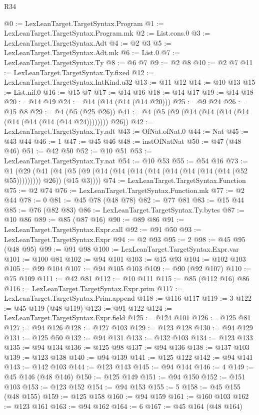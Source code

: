 \begin{lexlean}{R34}
\begin{coremodule}
@0 := LexLeanTarget.TargetSyntax.Program
@1 := LexLeanTarget.TargetSyntax.Program.mk
@2 := List.cons.{0}
@3 := LexLeanTarget.TargetSyntax.Adt
@4 := @2 @3
@5 := LexLeanTarget.TargetSyntax.Adt.mk
@6 := List.{0}
@7 := LexLeanTarget.TargetSyntax.Ty
@8 := @6 @7
@9 := @2 @8
@10 := @2 @7
@11 := LexLeanTarget.TargetSyntax.Ty.fixed
@12 := LexLeanTarget.TargetSyntax.IntKind.u32
@13 := @11 @12
@14 := @10 @13
@15 := List.nil.{0}
@16 := @15 @7
@17 := @14 @16
@18 := @14 @17
@19 := @14 @18
@20 := @14 @19
@24 := @14 (@14 (@14 (@14 @20)))
@25 := @9 @24
@26 := @15 @8
@29 := @4 (@5 (@25 @26))
@41 := @4 (@5 (@9 (@14 (@14 (@14 (@14 (@14 (@14 (@14 (@14 @24)))))))) @26))
@42 := LexLeanTarget.TargetSyntax.Ty.adt
@43 := OfNat.ofNat.{0}
@44 := Nat
@45 := @43 @44
@46 := 1
@47 := @45 @46
@48 := instOfNatNat
@50 := @47 (@48 @46)
@51 := @42 @50
@52 := @10 @51
@53 := LexLeanTarget.TargetSyntax.Ty.nat
@54 := @10 @53
@55 := @54 @16
@73 := @1
    (@29
      (@41 (@4 (@5 (@9 (@14 (@14 (@14 (@14 (@14 (@14 (@14 (@14 (@52 @55))))))))) @26)) (@15 @3))))
@74 := LexLeanTarget.TargetSyntax.Function
@75 := @2 @74
@76 := LexLeanTarget.TargetSyntax.Function.mk
@77 := @2 @44
@78 := 0
@81 := @45 @78 (@48 @78)
@82 := @77 @81
@83 := @15 @44
@85 := @76 (@82 @83)
@86 := LexLeanTarget.TargetSyntax.Ty.bytes
@87 := @10 @86
@89 := @85 (@87 @16)
@90 := @89 @86
@91 := LexLeanTarget.TargetSyntax.Expr.call
@92 := @91 @50
@93 := LexLeanTarget.TargetSyntax.Expr
@94 := @2 @93
@95 := 2
@98 := @45 @95 (@48 @95)
@99 := @91 @98
@100 := LexLeanTarget.TargetSyntax.Expr.var
@101 := @100 @81
@102 := @94 @101
@103 := @15 @93
@104 := @102 @103
@105 := @99 @104
@107 := @94 @105 @103
@109 := @90 (@92 @107)
@110 := @75 @109
@111 := @42 @81
@112 := @10 @111
@115 := @85 (@112 @16) @86
@116 := LexLeanTarget.TargetSyntax.Expr.prim
@117 := LexLeanTarget.TargetSyntax.Prim.append
@118 := @116 @117
@119 := 3
@122 := @45 @119 (@48 @119)
@123 := @91 @122
@124 := LexLeanTarget.TargetSyntax.Expr.field
@125 := @124 @101
@126 := @125 @81
@127 := @94 @126
@128 := @127 @103
@129 := @123 @128
@130 := @94 @129
@131 := @125 @50
@132 := @94 @131
@133 := @132 @103
@134 := @123 @133
@135 := @94 @134
@136 := @125 @98
@137 := @94 @136
@138 := @137 @103
@139 := @123 @138
@140 := @94 @139
@141 := @125 @122
@142 := @94 @141
@143 := @142 @103
@144 := @123 @143
@145 := @94 @144
@146 := 4
@149 := @45 @146 (@48 @146)
@150 := @125 @149
@151 := @94 @150
@152 := @151 @103
@153 := @123 @152
@154 := @94 @153
@155 := 5
@158 := @45 @155 (@48 @155)
@159 := @125 @158
@160 := @94 @159
@161 := @160 @103
@162 := @123 @161
@163 := @94 @162
@164 := 6
@167 := @45 @164 (@48 @164)

\end{coremodule}
\end{lexlean}
